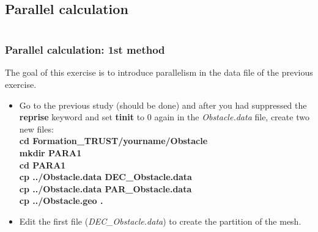 \documentclass[10pt, hyperref={unicode=true,pdfusetitle, bookmarks=true,bookmarksnumbered=false,bookmarksopen=false, breaklinks=false,pdfborder={0 0 1},backref=true,colorlinks=true,linkcolor=darkblue,pageanchor}]{beamer}
\begin{document}
\subsection{Parallel calculation} \label{exo_para_1}
\begin{frame}
\begin{small}
\begin{columns}[c] 
\tableofcontents[sections={1-9},currentsection, currentsubsection]
\tableofcontents[sections={10-16},currentsection, currentsubsection]
\end{columns}
\end{small}
\end{frame}
\begin{frame}
\frametitle{Parallel calculation: 1st method}
\begin{block}{}

The goal of this exercise is to introduce parallelism in the data file of the previous exercise.

\begin{itemize}
\item Go to the previous study (should be done) and after you had suppressed the \textbf{reprise} keyword and set \textbf{tinit} to 0 again in the \textit{Obstacle.data} file, create two new files:\\
\textbf{cd Formation\_TRUST/yourname/Obstacle} \\
\textbf{mkdir PARA1} \\
\textbf{cd PARA1} \\
\textbf{cp ../Obstacle.data DEC\_Obstacle.data} \\
\textbf{cp ../Obstacle.data PAR\_Obstacle.data} \\
\textbf{cp ../Obstacle.geo .}\\
\vspace{0.3cm}
\item Edit the first file (\textit{DEC\_Obstacle.data}) to create the partition of the mesh.
\end{itemize}

\end{block}
\end{frame}
\end{document}
